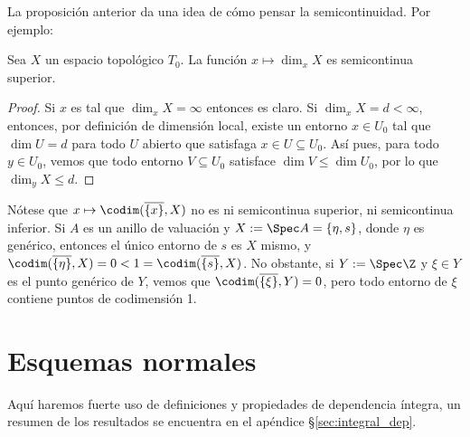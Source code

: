 La proposición anterior da una idea de cómo pensar la semicontinuidad. Por ejemplo:
\begin{prop}
	Sea $X$ un espacio topológico $T_0$.
	La función $x \mapsto \dim_x X$ es semicontinua superior.
\end{prop}
\begin{proof}
	Si $x$ es tal que $\dim_x X = \infty$ entonces es claro.
	Si $\dim_x X = d < \infty$, entonces, por definición de dimensión local, existe un entorno $x \in U_0$
	tal que $\dim U = d$ para todo $U$ abierto que satisfaga $x \in U \subseteq U_0$.
	Así pues, para todo $y \in U_0$, vemos que todo entorno $V \subseteq U_0$ satisface $\dim V \le \dim U_0$, por lo que
	$\dim_y X \le d$.
\end{proof}
Nótese que $x \mapsto \codim( \overline{\{ x \}}, X )$ no es ni semicontinua superior, ni semicontinua inferior.
Si $A$ es un anillo de valuación y $X := \Spec A = \{ \eta, s \}$, donde $\eta$ es genérico, entonces el único entorno de $s$ es $X$ mismo,
y $\codim( \overline{\{ \eta \}}, X ) = 0 < 1 = \codim(\overline{\{ s \}}, X)$.
No obstante, si $Y := \Spec\Z$ y $\xi \in Y$ es el punto genérico de $Y$, vemos que $\codim(\overline{\{ \xi \}}, Y) = 0$,
pero todo entorno de $\xi$ contiene puntos de codimensión 1.

\section{Esquemas normales}
Aquí haremos fuerte uso de definiciones y propiedades de dependencia
íntegra, un resumen de los resultados se encuentra en el apéndice \S\ref{sec:integral_dep}.

